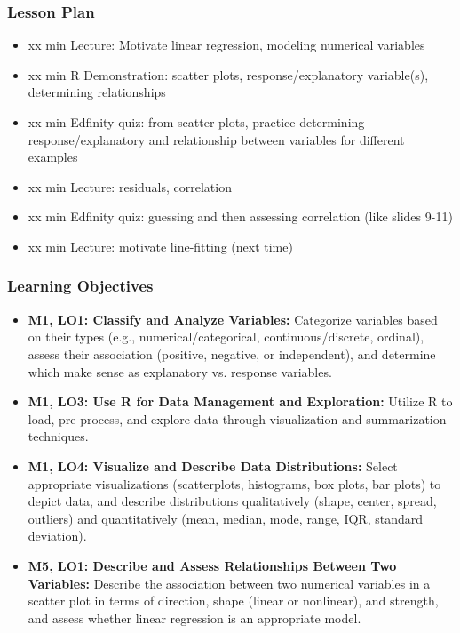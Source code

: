 \begin{frame}
    \frametitle{Lesson Plan}
    \begin{itemize}
        \item xx min Lecture: Motivate linear regression, modeling numerical variables
        \item xx min R Demonstration: scatter plots, response/explanatory variable(s), determining relationships  %
        \item xx min Edfinity quiz: from scatter plots, practice determining response/explanatory and relationship between variables for different examples
        \item xx min Lecture: residuals, correlation
        \item xx min Edfinity quiz: guessing and then assessing correlation (like slides 9-11)
        \item xx min Lecture: motivate line-fitting (next time)
    \end{itemize}
\end{frame}

\begin{frame}
    \frametitle{Learning Objectives}
    \begin{itemize}
        \item \textbf{M1, LO1: Classify and Analyze Variables:} Categorize variables based on their types (e.g., numerical/categorical, continuous/discrete, ordinal), assess their association (positive, negative, or independent), and determine which make sense as explanatory vs. response variables.
        \item \textbf{M1, LO3: Use R for Data Management and Exploration:} Utilize R to load, pre-process, and explore data through visualization and summarization techniques.
        \item \textbf{M1, LO4: Visualize and Describe Data Distributions:} Select appropriate visualizations (scatterplots, histograms, box plots, bar plots) to depict data, and describe distributions qualitatively (shape, center, spread, outliers) and quantitatively (mean, median, mode, range, IQR, standard deviation).
        \item \textbf{M5, LO1: Describe and Assess Relationships Between Two Variables:} Describe the association between two numerical variables in a scatter plot in terms of direction, shape (linear or nonlinear), and strength, and assess whether linear regression is an appropriate model.    
    \end{itemize}
\end{frame}
    

